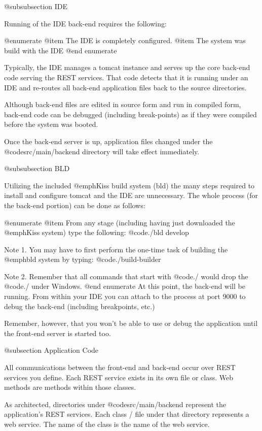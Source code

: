 @subsubsection IDE

Running of the IDE back-end requires the following:

@enumerate
@item
The IDE is completely configured.
@item
The system was build with the IDE
@end enumerate

Typically, the IDE manages a tomcat instance and serves up the core
back-end code serving the REST services.  That code detects that it is
running under an IDE and re-routes all back-end application files back
to the source directories.

Although back-end files are edited in source form and run in compiled
form, back-end code can be debugged (including break-points) as if
they were compiled before the system was booted.

Once the back-end server is up, application files changed under the
@code{src/main/backend} directory will take effect immediately.

@subsubsection BLD

Utilizing the included @emph{Kiss build system (bld)} the many steps required 
to install and configure tomcat and the IDE are unnecessary.  The whole process
(for the back-end portion) can be done as follows:

@enumerate
@item
From any stage (including having just downloaded the @emph{Kiss} system) type
the following:  @code{./bld develop}

Note 1.  You may have to first perform the one-time task of building
the @emph{bld} system by typing: @code{./build-builder}

Note 2.  Remember that all commands that start with @code{./} would drop
the @code{./} under Windows.
@end enumerate
At this point, the back-end will be running.  From within your IDE you
can attach to the process at port 9000 to debug the back-end (including
breakpoints, etc.)

Remember, however, that you won't be able to use or debug the application until
the front-end server is started too.

@subsection Application Code

All communications between the front-end and back-end occur over REST
services you define.  Each REST service exists in its own
file or class.  Web methods are methods within those classes.

As architected, directories under @code{src/main/backend}
represent the application's REST services.  Each class / file under that
directory represents a web service.  The name of the class is the name
of the web service.

